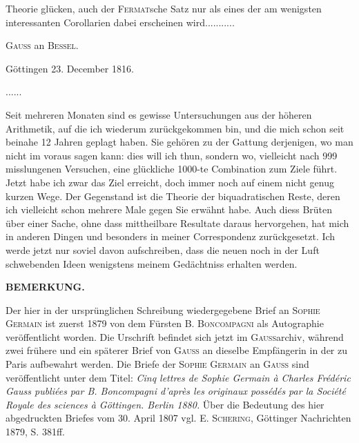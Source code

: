 \noindent Theorie glücken, auch der \textsc{Fermat}sche Satz nur als eines der am wenigsten
interessanten Corollarien dabei erscheinen wird.\quad .\quad .\quad .\quad .\quad .\quad .\quad .\quad .\quad .\quad .
\ClosingRule
\begin{center}\large\textsc{Gauss} an \textsc{Bessel}.\end{center}
\begin{flushright}Göttingen 23. December 1816.\end{flushright}
\noindent .\quad .\quad .\quad .\quad .\quad .\par
\par\indent Seit mehreren Monaten sind es gewisse Untersuchungen aus der höheren
Arithmetik, auf die ich wiederum zurückgekommen bin, und die mich schon
seit beinahe 12 Jahren geplagt haben. Sie gehören zu der Gattung derjenigen,
wo man nicht im voraus sagen kann: dies will ich thun, sondern wo, vielleicht
nach 999 misslungenen Versuchen, eine glückliche 1000-te Combination
zum Ziele führt. Jetzt habe ich zwar das Ziel erreicht, doch immer noch
auf einem nicht genug kurzen Wege. Der Gegenstand ist die Theorie der
biquadratischen Reste, deren ich vielleicht schon mehrere Male gegen Sie
erwähnt habe. Auch diess Brüten über einer Sache, ohne dass mittheilbare
Resultate daraus hervorgehen, hat mich in anderen Dingen und besonders in
meiner Correspondenz zurückgesetzt. Ich werde jetzt nur soviel davon aufschreiben,
dass die neuen noch in der Luft schwebenden Ideen wenigstens
meinem Gedächtniss erhalten werden.
\begin{center}\textbf{BEMERKUNG.}\end{center}
\begingroup\small
\par\indent Der hier in der ursprünglichen Schreibung wiedergegebene Brief an \textsc{Sophie Germain} ist zuerst 1879
von dem Fürsten B. \textsc{Boncompagni} als Autographie veröffentlicht worden. Die Urschrift befindet sich jetzt
im \textsc{Gauss}archiv, während zwei frühere und ein späterer Brief von \textsc{Gauss} an dieselbe Empfängerin in der
 zu Paris aufbewahrt werden. Die Briefe der \textsc{Sophie Germain} an \textsc{Gauss} sind
veröffentlicht unter dem Titel: \textit{Cinq lettres de Sophie Germain à Charles Frédéric Gauss publiées par
B. Boncompagni d’après les originaux possédés par la Société Royale des sciences à Göttingen. Berlin 1880.}
Über die Bedeutung des hier abgedruckten Briefes vom 30. April 1807 vgl. E. \textsc{Schering}, Göttinger Nachrichten
1879, S. 381ff.

